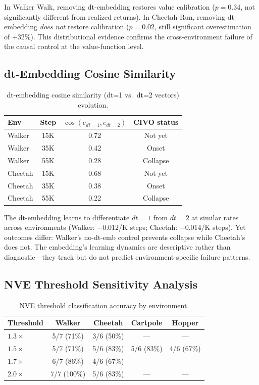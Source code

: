 \documentclass[10pt,twocolumn]{article}
\begin{document}
In Walker Walk, removing dt-embedding restores value calibration ($p=0.34$, not significantly different from realized returns). In Cheetah Run, removing dt-embedding \emph{does not} restore calibration ($p=0.02$, still significant overestimation of $+32\%$). This distributional evidence confirms the cross-environment failure of the causal control at the value-function level.

\subsection{dt-Embedding Cosine Similarity}
\label{sec:cosine}

\begin{table}[h]
\centering
\caption{dt-embedding cosine similarity (dt=1 vs.\ dt=2 vectors) evolution.}
\label{tab:cosine}
\begin{tabular}{lccc}
\toprule
Env & Step & $\cos(e_{dt=1}, e_{dt=2})$ & CIVO status \\
\midrule
Walker & 15K & 0.72 & Not yet \\
Walker & 35K & 0.42 & Onset \\
Walker & 55K & 0.28 & Collapse \\
Cheetah & 15K & 0.68 & Not yet \\
Cheetah & 35K & 0.38 & Onset \\
Cheetah & 55K & 0.22 & Collapse \\
\bottomrule
\end{tabular}
\end{table}

The dt-embedding learns to differentiate $dt=1$ from $dt=2$ at similar rates across environments (Walker: $-0.012$/K steps; Cheetah: $-0.014$/K steps). Yet outcomes differ: Walker's no-dt-emb control prevents collapse while Cheetah's does not. The embedding's learning dynamics are descriptive rather than diagnostic---they track but do not predict environment-specific failure patterns.

\subsection{NVE Threshold Sensitivity Analysis}
\label{sec:threshold}

\begin{table}[h]
\centering
\caption{NVE threshold classification accuracy by environment.}
\label{tab:threshold}
\begin{tabular}{lcccc}
\toprule
Threshold & Walker & Cheetah & Cartpole & Hopper \\
\midrule
$1.3\times$ & 5/7 (71\%) & 3/6 (50\%) & --- & --- \\
$1.5\times$ & 5/7 (71\%) & 5/6 (83\%) & 5/6 (83\%) & 4/6 (67\%) \\
$1.7\times$ & 6/7 (86\%) & 4/6 (67\%) & --- & --- \\
$2.0\times$ & 7/7 (100\%) & 5/6 (83\%) & --- & --- \\
\bottomrule
\end{tabular}
\end{table}
\end{document}
